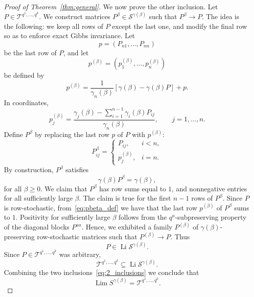 \documentclass[11pt,a4paper,longbibliography]{amsart}
\numberwithin{equation}{section}
\theoremstyle{plain}
\theoremstyle{definition}
\theoremstyle{remark}
\begin{document}
\begin{proof}[Proof of Theorem~\ref{thm:general}]
				We now prove the other inclusion.
				Let $P\in\mathcal T^{q^1,\ldots,q^k}$. 
				We construct matrices
				$P^{\beta}\in \mathcal{S}^{\gamma(\beta)}$
				such that
				$P^{\beta}\to P$.
				The idea is the following: we keep all rows of $P$ except the last one, and modify the final row so as to enforce exact Gibbs invariance.
				Let
				$$
				p=(P_{n1},\ldots,P_{nn})
				$$
				be the last row of $P$, and let
				$$
				p^{(\beta)}=(p^{(\beta)}_1,\ldots,p^{(\beta)}_n)
				$$
				be defined by
				\begin{equation}
					\label{eq:pbeta_def}
					p^{(\beta)}=\frac{1}{\gamma_n(\beta)}\left[\gamma(\beta)-\gamma(\beta)P\right]+p.
				\end{equation}
				In coordinates,
				\begin{equation}
					\label{eq:pbeta}
					p^{(\beta)}_j
					=
					\frac{
						\gamma_j(\beta)
						-
						\sum_{i=1}^{n-1}
						\gamma_i(\beta)P_{ij}
					}
					{\gamma_n(\beta)},
					\qquad
					j=1,\ldots,n.
				\end{equation}
				Define $P^{\beta}$ by replacing the last row $p$ of $P$ with $p^{(\beta)}$:
				\begin{equation}
					P^{\beta}_{ij}
					=
					\begin{cases}
						P_{ij}, & i<n,\\
						p^{(\beta)}_j, & i=n.
					\end{cases}
				\end{equation}
				By construction, $P^{\beta}$ satisfies
				$$
				\gamma(\beta)P^{\beta}
				=
				\gamma(\beta),
				$$
				for all $\beta\geq0$. 
				We claim that $P^{\beta}$ has row sums equal to $1$, and nonnegative entries for all sufficiently large $\beta$. The claim is true for the first $n-1$ rows of $P^{\beta}$. Since $P$ is row-stochastic, from~\eqref{eq:pbeta_def} we have that the last row $p^{(\beta)}$ of $P^{\beta}$ sums to $1$. 
				Positivity for sufficiently large $\beta$ follows from the $q^a$-subpreserving property of the diagonal blocks $P^{aa}$.
				Hence, we exhibited a family $P^{(\beta)}$ of  $\gamma(\beta)$-preserving row-stochastic matrices such that  $P^{(\beta)}\to P$.
				Thus
				$$
				P\in
				\operatorname*{Li}\mathcal{S}^{\gamma(\beta)}.
				$$
				Since $P\in\mathcal T^{q^1,\ldots,q^k}$ was arbitrary,
				$$
				\mathcal T^{q^1,\ldots,q^k}
				\subseteq
				\operatorname*{Li}\mathcal{S}^{\gamma(\beta)}. 
				$$
				Combining the two inclusions~\eqref{eq:2_inclusions}
				we conclude that
				\begin{equation}
					\operatorname{Lim}S^{\gamma(\beta)}= \mathcal T^{q^1,\ldots,q^k}.
				\end{equation}
				
				
			\end{proof}
			
\end{document}
